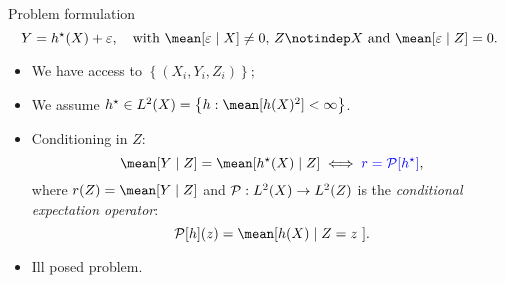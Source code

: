 \documentclass[aspectratio=169]{beamer}
\begin{document}
    \begin{frame}{Problem formulation}
        \begin{equation*}
            Y = \hstar ( X ) + \varepsilon, \quad \text{with $ \mean [ \varepsilon \mid X ] \neq 0 $, $ Z \notindep X $ and $ \mean [ \varepsilon \mid Z ] = 0 $}
        .\end{equation*}
        \begin{itemize}
            \item<1-> We have access to $ \left\{ ( X_{ i }, Y_{ i }, Z_{ i } ) \right\} $;
            \item<2-> We assume $ \hstar \in L^2 ( X ) = \left\{ h : \mean [ h ( X )^2 ] < \infty \right\} $.
            \item<3-> Conditioning in $ Z $:
                \begin{equation*}
                    \mean [ Y \mid Z ] = \mean [ \hstar ( X ) \mid Z ] \iff
                    {\color{blue} r = \meanop [ \hstar ]}
                ,\end{equation*}
                where $ r ( Z ) = \mean [ Y \mid Z ] $ and $ \mathcal{P} : L^2 ( X ) \to L^2 ( Z ) $ is the \emph{conditional expectation operator}:
                \begin{equation*}
                    \meanop [ h ] ( z ) = \mean [ h ( X ) \mid Z = z \ ]
                .\end{equation*}
            \item<4-> $\mathrm{I}$ll posed problem.
        \end{itemize}
    \end{frame}
\end{document}
